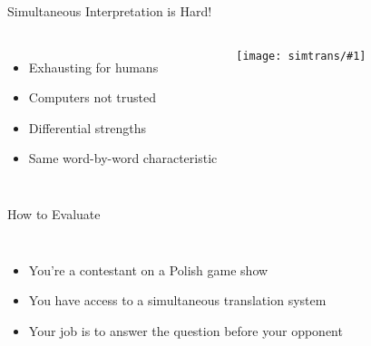 \documentclass[compress]{beamer}
\newcommand{\gfxs}[2]{
\begin{center}
	\texttt{[image: simtrans/\#1]}
\end{center}
}
\begin{document}
\begin{frame}{Simultaneous Interpretation is Hard!}

  \begin{columns}
  \begin{itemize}
    \item Exhausting for humans
    \item Computers not trusted
    \item Differential strengths
    \item Same word-by-word characteristic
  \end{itemize}

 \gfxs{computer-interpreter}{1.0}
 \end{columns}
\end{frame}

\begin{frame}{How to Evaluate}

  \begin{columns}
    \begin{itemize}
    \item You're a contestant on a Polish game show
    \item You have access to a simultaneous translation system
    \item Your job is to answer the question before your opponent
    \end{itemize}
  \end{columns}

\end{frame}
\end{document}
